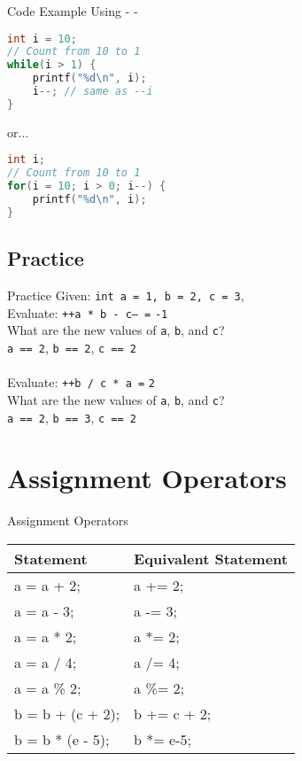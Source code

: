 \documentclass[graphics]{beamer}
\begin{document}
\begin{frame}[fragile]{Code Example Using - -}
    \begin{lstlisting}[language=C,basicstyle=\footnotesize,keywordstyle=\color{blue},commentstyle=\color{green},showstringspaces=false,stringstyle=\color{red}]
int i = 10;
// Count from 10 to 1
while(i > 1) {
    printf("%d\n", i);
    i--; // same as --i
}
\end{lstlisting}
or...
    \begin{lstlisting}[language=C,basicstyle=\footnotesize,keywordstyle=\color{blue},commentstyle=\color{green},showstringspaces=false,stringstyle=\color{red}]
int i;
// Count from 10 to 1
for(i = 10; i > 0; i--) {
    printf("%d\n", i);
}
\end{lstlisting}
\end{frame}

\subsection{Practice}
\begin{frame}{Practice}
    Given: \texttt{int a = 1, b = 2, c = 3}, \\
    Evaluate: \texttt{++a * b - c-- =} 
    \pause
    \texttt{-1} \\ What are the new values of \texttt{a}, \texttt{b}, and \texttt{c}? \\
    \pause
    \texttt{a == 2}, \texttt{b == 2}, \texttt{c == 2} \\ ~~ \\
    \pause
    Evaluate: \texttt{++b / c * a =} 
    \pause
    \texttt{2} \\ What are the new values of \texttt{a}, \texttt{b}, and \texttt{c}? \\
    \pause
    \texttt{a == 2}, \texttt{b == 3}, \texttt{c == 2}
\end{frame}

\section{Assignment Operators}
\begin{frame}{Assignment Operators}
    \begin{tabular}{l l}
        Statement & Equivalent Statement \\ \hline
        a = a + 2; & a += 2; \\
        a = a - 3; & a -= 3; \\
        a = a * 2; & a *= 2; \\
        a = a / 4; & a /= 4; \\
        a = a \% 2; & a \%= 2; \\
        b = b + (c + 2); & b += c + 2; \\
        b = b * (e - 5); & b *= e-5;
    \end{tabular}
\end{frame}
\end{document}
